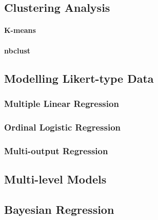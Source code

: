  \subsection{Clustering Analysis}
    \paragraph{K-means}
    \paragraph{nbclust}

  \subsection{Modelling Likert-type Data}

    \subsubsection{Multiple Linear Regression}

    \subsubsection{Ordinal Logistic Regression}

    \subsubsection{Multi-output Regression}

  \subsection{Multi-level Models}

  \subsection{Bayesian Regression}



